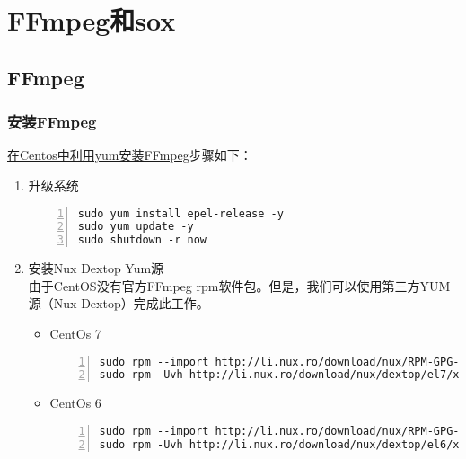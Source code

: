\chapter{FFmpeg和sox}
\section{FFmpeg}
\subsection{安装FFmpeg}
\href{https://www.jianshu.com/p/2b98e0f87720}{在Centos中利用yum安装FFmpeg}步骤如下：
\begin{enumerate}
\item 升级系统
\begin{lstlisting}[language = shell, numbers=left, 
         numberstyle=\tiny,keywordstyle=\color{blue!70},
         commentstyle=\color{red!50!green!50!blue!50},frame=shadowbox,
         rulesepcolor=\color{red!20!green!20!blue!20},basicstyle=\ttfamily]
sudo yum install epel-release -y
sudo yum update -y
sudo shutdown -r now
\end{lstlisting}
\item 安装Nux Dextop Yum源 \\
	由于CentOS没有官方FFmpeg rpm软件包。但是，我们可以使用第三方YUM源（Nux Dextop）完成此工作。
	\begin{itemize}
		\item CentOs 7
\begin{lstlisting}[language = shell, numbers=left, 
         numberstyle=\tiny,keywordstyle=\color{blue!70},
         commentstyle=\color{red!50!green!50!blue!50},frame=shadowbox,
         rulesepcolor=\color{red!20!green!20!blue!20},basicstyle=\ttfamily]
sudo rpm --import http://li.nux.ro/download/nux/RPM-GPG-KEY-nux.ro
sudo rpm -Uvh http://li.nux.ro/download/nux/dextop/el7/x86_64/nux-dextop-release-0-5.el7.nux.noarch.rpm
\end{lstlisting}
		\item CentOs 6
\begin{lstlisting}[language = shell, numbers=left, 
         numberstyle=\tiny,keywordstyle=\color{blue!70},
         commentstyle=\color{red!50!green!50!blue!50},frame=shadowbox,
         rulesepcolor=\color{red!20!green!20!blue!20},basicstyle=\ttfamily]
sudo rpm --import http://li.nux.ro/download/nux/RPM-GPG-KEY-nux.ro
sudo rpm -Uvh http://li.nux.ro/download/nux/dextop/el6/x86_64/nux-dextop-release-0-2.el6.nux.noarch.rpm
\end{lstlisting}
	\end{itemize}

\end{enumerate}
